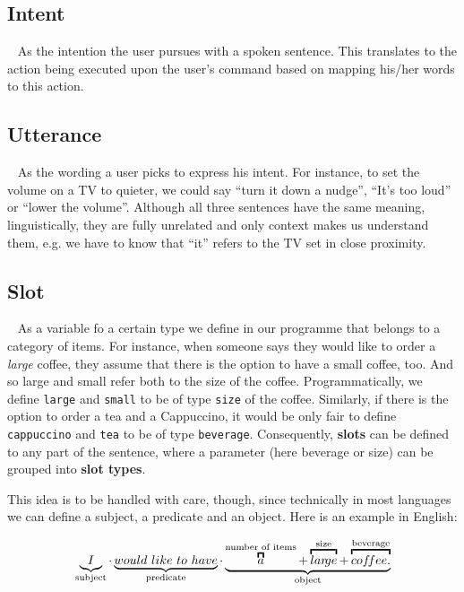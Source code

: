 	\subsection*{Intent}~\label{intents}
	As the intention the user pursues with a spoken sentence. This translates to the action being executed upon the user's command based on mapping his/her words to this action.
	
	\subsection*{Utterance}~\label{utterances}
	As the wording a user picks to express his intent. For instance, to set the volume on a TV to quieter, we could say ``turn it down a nudge'', ``It's too loud'' or ``lower the volume''. Although all three sentences have the same meaning, linguistically, they are fully unrelated and only context makes us understand them, e.g. we have to know that ``it'' refers to the TV set in close proximity.
	
	\subsection*{Slot}~\label{slots}
	As a variable fo a certain type we define in our programme that belongs to a category of items. For instance, when someone says they would like to order a \textit{large} coffee, they assume that there is the option to have a small coffee, too. And so large and small refer both to the size of the coffee. Programmatically, we define \texttt{large} and \texttt{small} to be of type \texttt{size} of the coffee. Similarly, if there is the option to order a tea and a Cappuccino, it would be only fair to define \texttt{cappuccino} and \texttt{tea} to be of type \texttt{beverage}. Consequently, \textbf{slots} can be defined to any part of the sentence, where a parameter (here beverage or size) can be grouped into \textbf{slot types}. 



	This idea is to be handled with care, though, since technically in most languages we can define a subject, a predicate and an object. Here is an example in English:
	
	\[
	\underbrace{I}_\text{subject} \cdot
	\underbrace{would \ like  \ to \ have}_\text{predicate} \cdot
	\underbrace{
		\overbracket{a}^\text{number of items} +		
		\overbracket{lar\!ge}^\text{size} +
		\overbracket{cof \mkern-3mu fee.}^\text{beverage}
	}_\text{object} 
	\]
	
